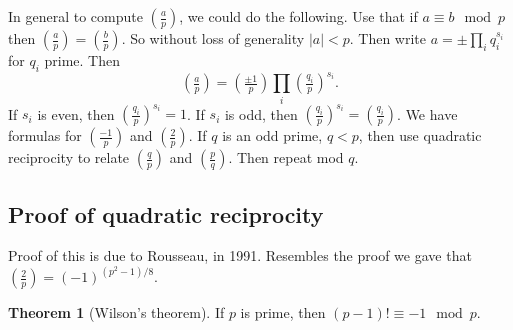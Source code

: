 \documentclass{article}
\newcommand{\rb}[1]{\left( #1 \right)}
\newcommand{\abs}[1]{\left\lvert #1 \right\rvert}
\newcommand{\legendre}[2]{\rb{\tfrac{#1}{#2}}}
\theoremstyle{definition}\newtheorem{definition}{Definition}
\theoremstyle{definition}\newtheorem{remark}[definition]{Remark}
\theoremstyle{definition}\newtheorem*{example}{Example}
\theoremstyle{definition}\newtheorem*{note}{Note}
\newtheorem{theorem}[definition]{Theorem}
\begin{document}
In general to compute $ \legendre{a}{p} $, we could do the following. Use that if $ a \equiv b \mod p $ then $ \legendre{a}{p} = \legendre{b}{p} $. So without loss of generality $ \abs{a} < p $. Then write $ a = \pm \prod_i q_i^{s_i} $ for $ q_i $ prime. Then
$$ \legendre{a}{p} = \legendre{\pm 1}{p} \prod_i \legendre{q_i}{p}^{s_i}. $$
If $ s_i $ is even, then $ \legendre{q_i}{p}^{s_i} = 1 $. If $ s_i $ is odd, then $ \legendre{q_i}{p}^{s_i} = \legendre{q_i}{p} $. We have formulas for $ \legendre{-1}{p} $ and $ \legendre{2}{p} $. If $ q $ is an odd prime, $ q < p $, then use quadratic reciprocity to relate $ \legendre{q}{p} $ and $ \legendre{p}{q} $. Then repeat mod $ q $.


\subsection{Proof of quadratic reciprocity}

Proof of this is due to Rousseau, in 1991. Resembles the proof we gave that $ \legendre{2}{p} = \rb{-1}^{\rb{p^2 - 1} / 8} $.

\begin{theorem}[Wilson's theorem]
If $ p $ is prime, then $ \rb{p - 1}! \equiv -1 \mod p $.
\end{theorem}
\end{document}
